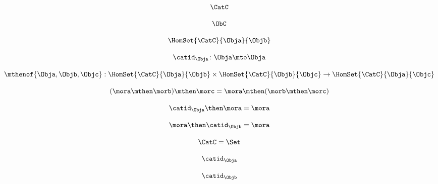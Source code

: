 {\begin{forslides}
        \begin{equation}
            \label{eq:15}
            \CatC
        \end{equation}

        \begin{equation}
            \label{eq:16}
            \ObC
        \end{equation}

        \begin{equation}
            \label{eq:17}
            \HomSet{\CatC}{\Obja}{\Objb}
        \end{equation}

        \begin{equation}
            \label{eq:18}
            \catid_{\Obja}\colon \Obja \mto \Obja
        \end{equation}

        \begin{equation}
            \label{eq:19}
            \mthenof{\Obja,\Objb,\Objc}: \HomSet{\CatC}{\Obja}{\Objb} \times \HomSet{\CatC}{\Objb}{\Objc}\to \HomSet{\CatC}{\Obja}{\Objc}
        \end{equation}

        \begin{equation}
            \label{eq:20}
            (\mora\mthen \morb)
            \mthen \morc= \mora \mthen (\morb \mthen \morc)
        \end{equation}

        \begin{equation}
            \label{eq:21}
            \catid_{\Obja} \then \mora = \mora
        \end{equation}

        \begin{equation}
            \label{eq:22}
            \mora \then \catid_{\Objb} = \mora
        \end{equation}

        \begin{equation}
            \label{eq:23}
            \CatC = \Set
        \end{equation}

        \begin{equation}
            \label{eq:24}
            \catid_{\Obja}
        \end{equation}

        \begin{equation}
            \label{eq:25}
            \catid_{\Objb}
        \end{equation}


\end{forslides}}
